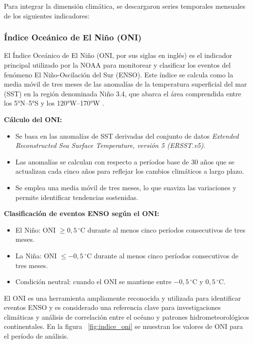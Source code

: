 Para integrar la dimensión climática, se descargaron series temporales mensuales de los siguientes indicadores:

\subsubsection{Índice Oceánico de El Niño (ONI)}

El Índice Oceánico de El Niño (ONI, por sus siglas en inglés) es el indicador principal utilizado por la NOAA para monitorear y clasificar los eventos del fenómeno El Niño-Oscilación del Sur (ENSO). Este índice se calcula como la media móvil de tres meses de las anomalías de la temperatura superficial del mar (SST) en la región denominada Niño 3.4, que abarca el área comprendida entre los 5°N–5°S y los 120°W–170°W \citep{noaaONI}.

\textbf{Cálculo del ONI:}
\begin{itemize}
    \item Se basa en las anomalías de SST derivadas del conjunto de datos \textit{Extended Reconstructed Sea Surface Temperature, versión 5 (ERSST.v5)}.
    \item Las anomalías se calculan con respecto a períodos base de 30 años que se actualizan cada cinco años para reflejar los cambios climáticos a largo plazo.
    \item Se emplea una media móvil de tres meses, lo que suaviza las variaciones y permite identificar tendencias sostenidas.
\end{itemize}

\textbf{Clasificación de eventos ENSO según el ONI:}
\begin{itemize}
    \item El Niño: ONI $\geq 0{,}5\,^\circ$C durante al menos cinco períodos consecutivos de tres meses.
    \item La Niña: ONI $\leq -0{,}5\,^\circ$C durante al menos cinco períodos consecutivos de tres meses.
    \item Condición neutral: cuando el ONI se mantiene entre $-0{,}5\,^\circ$C y $0{,}5\,^\circ$C.
\end{itemize}

El ONI es una herramienta ampliamente reconocida y utilizada para identificar eventos ENSO y es considerado una referencia clave para investigaciones climáticas y análisis de correlación entre el océano y patrones hidrometeorológicos continentales. En la figura ~\ref{fig:indice_oni} se muestran los valores de ONI para el período de análisis. 





